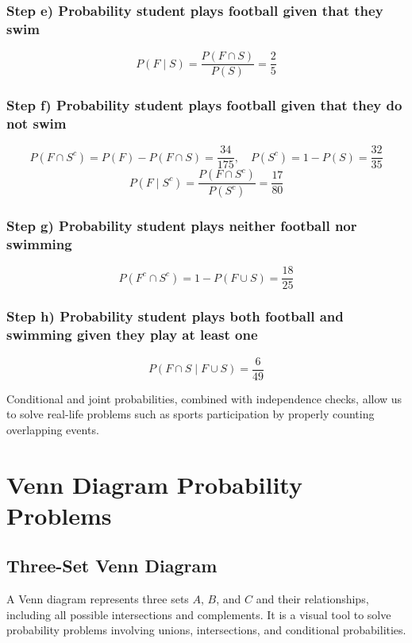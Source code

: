 \begin{eg}
\subsubsection*{Step e) Probability student plays football given that they swim}
\[
P(F \mid S) = \frac{P(F \cap S)}{P(S)} = \frac{2}{5}
\]

\subsubsection*{Step f) Probability student plays football given that they do \textbf{not} swim}
\[
P(F \cap S^c) = P(F) - P(F \cap S) = \frac{34}{175}, \quad P(S^c) = 1 - P(S) = \frac{32}{35}
\]
\[
P(F \mid S^c) = \frac{P(F \cap S^c)}{P(S^c)} = \frac{17}{80}
\]

\subsubsection*{Step g) Probability student plays neither football nor swimming}
\[
P(F^c \cap S^c) = 1 - P(F \cup S) = \frac{18}{25}
\]

\subsubsection*{Step h) Probability student plays both football and swimming given they play at least one}
\[
P(F \cap S \mid F \cup S) = \frac{6}{49}
\]
\end{eg}

\begin{remark}
Conditional and joint probabilities, combined with independence checks, allow us to solve real-life problems such as sports participation by properly counting overlapping events.
\end{remark}

\section{Venn Diagram Probability Problems}

\subsection{Three-Set Venn Diagram}
\begin{definition}
A Venn diagram represents three sets $A$, $B$, and $C$ and their relationships, including all possible intersections and complements. It is a visual tool to solve probability problems involving unions, intersections, and conditional probabilities.
\end{definition}

